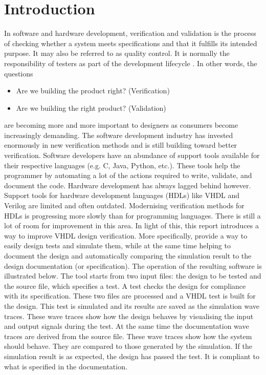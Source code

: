 \chapter{Introduction}
In software and hardware development, verification and validation is the process of checking whether a system meets specifications and that it fulfills its intended purpose. It may also be referred to as quality control. It is normally the responsibility of testers as part of the development lifecycle \cite{intro:wiki}.\nline
In other words, the questions
\begin{itemize}
	\item Are we building the product right? (Verification)
	\item Are we building the right product? (Validation)
\end{itemize}
are becoming more and more important to designers as consumers become increasingly demanding.
\npar
The software development industry has invested enormously in new verification methods and is still building toward better verification. Software developers have an abundance of support tools available for their respective languages (e.g. C, Java, Python, etc.). These tools help the programmer by automating a lot of the actions required to write, validate, and document the code.
\npar
Hardware development has always lagged behind however. Support tools for hardware development languages (HDLs) like VHDL and Verilog are limited and often outdated. Modernising verification methods for HDLs is progressing more slowly than for programming languages. There is still a lot of room for improvement in this area.
\npar
In light of this, this report introduces a way to improve VHDL design verification. More specifically, provide a way to easily design tests and simulate them, while at the same time helping to document the design and automatically comparing the simulation result to the design documentation (or specification). The operation of the resulting software is illustrated below.%
\nline
The tool starts from two input files: the design to be tested and the source file, which specifies a test. A test checks the design for compliance with its specification. These two files are processed and a VHDL test is built for the design. This test is simulated and its results are saved as the simulation wave traces. These wave traces show how the design behaves by visualising the input and output signals during the test. At the same time the documentation wave traces are derived from the source file. These wave traces show how the system should behave. They are compared to those generated by the simulation. If the simulation result is as expected, the design has passed the test. It is compliant to what is specified in the documentation. 

